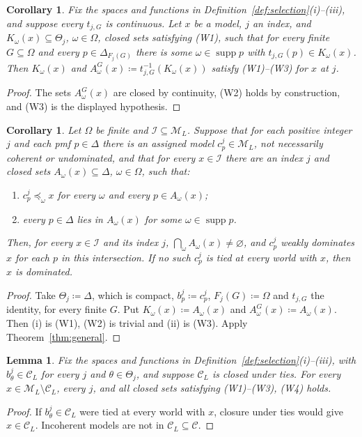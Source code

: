 \documentclass[11pt]{article}
\newtheorem{lemma}[theorem]{Lemma}
\newtheorem{corollary}[theorem]{Corollary}
\theoremstyle{definition}
\theoremstyle{remark}
\newcommand{\M}{\mathcal M}
\newcommand{\C}{\mathcal C}
\newcommand{\I}{\mathcal I}
\newcommand{\supp}{\operatorname{supp}}
\begin{document}
\begin{corollary}\label{cor:inverse}
Fix the spaces and functions in Definition~\ref{def:selection}(i)--(iii), and suppose every $t_{j,G}$ is continuous. Let $x$ be a model, $j$ an index, and $K_\omega(x)\subseteq\Theta_j$, $\omega\in\Omega$, closed sets satisfying (W1), such that for every finite $G\subseteq\Omega$ and every $p\in\Delta_{F_j(G)}$ there is some $\omega\in\supp p$ with $t_{j,G}(p)\in K_\omega(x)$. Then $K_\omega(x)$ and $A^G_\omega(x)\coloneqq t_{j,G}^{-1}(K_\omega(x))$ satisfy (W1)--(W3) for $x$ at $j$.
\end{corollary}
\begin{proof}
The sets $A^G_\omega(x)$ are closed by continuity, (W2) holds by construction, and (W3) is the displayed hypothesis.
\end{proof}

\begin{corollary}\label{cor:finite}
Let $\Omega$ be finite and $\I\subseteq\M_L$. Suppose that for each positive integer $j$ and each pmf $p\in\Delta$ there is an assigned model $c^j_p\in\M_L$, not necessarily coherent or undominated, and that for every $x\in\I$ there are an index $j$ and closed sets $A_\omega(x)\subseteq\Delta$, $\omega\in\Omega$, such that:
\begin{enumerate}[label=(\roman*)]
\item $c^j_p\preceq_\omega x$ for every $\omega$ and every $p\in A_\omega(x)$;
\item every $p\in\Delta$ lies in $A_\omega(x)$ for some $\omega\in\supp p$.
\end{enumerate}
Then, for every $x\in\I$ and its index $j$, $\bigcap_\omega A_\omega(x)\ne\varnothing$, and $c^j_p$ weakly dominates $x$ for each $p$ in this intersection. If no such $c^j_p$ is tied at every world with $x$, then $x$ is dominated.
\end{corollary}
\begin{proof}
Take $\Theta_j\coloneqq\Delta$, which is compact, $b^j_p\coloneqq c^j_p$, $F_j(G)\coloneqq\Omega$ and $t_{j,G}$ the identity, for every finite $G$. Put $K_\omega(x)\coloneqq A_\omega(x)$ and $A^G_\omega(x)\coloneqq A_\omega(x)$. Then (i) is (W1), (W2) is trivial and (ii) is (W3). Apply Theorem~\ref{thm:general}.
\end{proof}

\begin{lemma}\label{lem:tie-sufficient}
Fix the spaces and functions in Definition~\ref{def:selection}(i)--(iii), with $b^j_\theta\in\C_L$ for every $j$ and $\theta\in\Theta_j$, and suppose $\C_L$ is closed under ties. For every $x\in\M_L\setminus\C_L$, every $j$, and all closed sets satisfying (W1)--(W3), (W4) holds.
\end{lemma}
\begin{proof}
If $b^j_\theta\in\C_L$ were tied at every world with $x$, closure under ties would give $x\in\C_L$. Incoherent models are not in $\C_L\subseteq\C$.
\end{proof}
\end{document}
